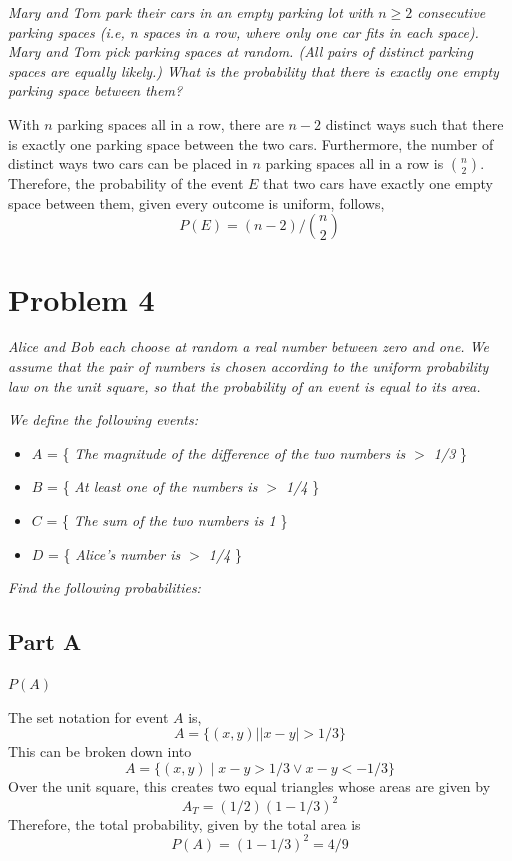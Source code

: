 \documentclass{article}
\begin{document}
\textit{Mary and Tom park their cars in an empty parking lot with $ n \geq 2 $
consecutive parking spaces (i.e, n spaces in a row, where only one car fits in
each space). Mary and Tom pick parking spaces at random. (All pairs of distinct
parking spaces are equally likely.) What is the probability that there is
exactly one empty parking space between them?}

\bigbreak

With $ n $ parking spaces all in a row, there are $ n - 2 $ distinct ways such
that there is exactly one parking space between the two cars. Furthermore, the
number of distinct ways two cars can be placed in $ n $ parking spaces all in a
row is $ \binom{n}{2} $. Therefore, the probability of the event $ E $ that two
cars have exactly one empty space between them, given every outcome is uniform,
follows,
$$ P(E) = (n - 2) / \binom{n}{2} $$

\section*{Problem 4}

\textit{Alice and Bob each choose at random a real number between zero and one.
We assume that the pair of numbers is chosen according to the uniform
probability law on the unit square, so that the probability of an event is equal
to its area.}

\textit{We define the following events:}

\begin{itemize}
    \item[] $ A $ = \{ \textit{The magnitude of the difference of the two
        numbers is $ > $ 1/3} \}
    \item[] $ B $ = \{ \textit{At least one of the numbers is $ > $ 1/4} \}
    \item[] $ C $ = \{ \textit{The sum of the two numbers is 1} \}
    \item[] $ D $ = \{ \textit{Alice’s number is $ > $ 1/4} \}
\end{itemize}

\textit{Find the following probabilities:}

\subsection*{Part A}

\textit{$ P(A) $}

\bigbreak

The set notation for event $ A $ is,
$$ A = \{ (x, y) \mid \vert x - y \vert > 1/3 \} $$
This can be broken down into
$$ A = \{ (x, y) \mid x - y > 1/3 \lor x - y < -1/3 \} $$
Over the unit square, this creates two equal triangles whose areas are given by
$$ A_T = (1/2) (1 - 1/3)^2 $$
Therefore, the total probability, given by the total area is
$$ P(A) = (1 - 1/3)^2 = 4/9 $$
\end{document}
